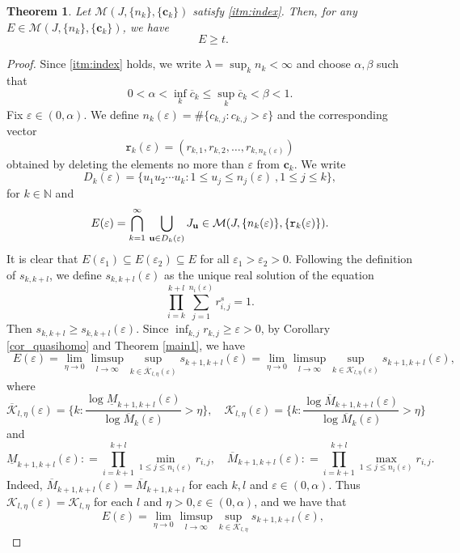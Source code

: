 \documentclass[12pt]{amsart}
\numberwithin{equation}{section}
\theoremstyle{plain}
\newtheorem{theorem}{Theorem}[section]
\theoremstyle{remark}
\theoremstyle{definition}
\newcommand{\ok}{\overline{\mathcal{K}}}
\newcommand{\kk}{\mathcal{K}}
\newcommand{\om}{\overline{M}}
\newcommand{\um}{\underline{M}}
\newcommand{\N}{\mathbb{N}}
\newcommand{\bu}{\mathbf{u}}
\newcommand{\ccc}{\mathbf{c}}
\newcommand{\rrr}{\mathtt{r}}
\newcommand{\eps}{\varepsilon}
\newcommand{\oc}{\overline{c}}
\newcommand{\lam}{\lambda}
\renewcommand{\ge}{\geqslant}
\renewcommand{\le}{\leqslant}
\renewcommand{\leq}{\leqslant}
\DeclareMathOperator{\dimqa}{dim_{qA}}
\begin{document}
	\iffalse
	\begin{theorem}\label{dayu2}
		Let $\mathcal{M}(J,\{n_k\},\{\ccc_k\})$ satisfy \ref{itm:index}. Then, for any $E\in\mathcal{M}(J,\{n_k\},\{\ccc_k\})$, we have
		\[
		\dimqa E\ge t.
		\]
	\end{theorem}
	\begin{proof}%
		Since \ref{itm:index} holds,  we write  $\lam=\sup_k n_k<\infty$ and choose  $\alpha,\beta$ such that
		\[
		0<\alpha<\inf_k \oc_k\le \sup_k \oc_k <\beta<1.
		\]
		Fix $\eps\in (0,\alpha)$. We define $n_k(\eps)=\#\{c_{k,j}:c_{k,j}>\eps\}$ and the corresponding vector
		\[
		\rrr_k(\eps)=(r_{k,1},r_{k,2},\ldots,r_{k,n_k(\eps)})
		\]
		obtained by deleting the elements no more
		than $\eps$ from $\ccc_k$. We write
		\[
		D_{k}(\eps)=\{u_{1}u_{2}\cdots u_{k}:1\leq u_{j}\leq
		n_{j}(\eps)\ , 1\le j\leq k\},
		\]
		for $k\in\N$ and
		\[
		E(\eps)=\bigcap_{k=1}^{\infty }\,\bigcup_{%
			\bu\in D_{k}(\eps)}J_{\bu}\in \mathcal{M}(J,\{n_k(\eps)\},\{\rrr_k(\eps)\}).
		\]
		It is clear that $E(\eps_1)\subseteq E(\eps_2)\subseteq E$ for all $\eps_1>\eps_2>0$. Following the definition of $s_{k,k+l}$, we define $s_{k,k+l}(\eps)$ as the unique real solution of
		the equation
		\[
		\prod_{i=k}^{k+l} \sum_{j=1}^{n_i(\eps)}r_{i,j}^s  =1.
		\]
		Then $s_{k,k+l}\ge s_{k,k+l}(\eps)$. Since $\inf_{k,j} r_{k,j}\ge \eps >0$, by Corollary \ref{cor_quasihomo} and Theorem \ref{main1}, we have
		\[
		\dimqa E(\eps)=\lim_{\eta\to 0}\limsup_{l\to\infty}\sup_{k\in \ok_{l,\eta}(\eps)} s_{k+1,k+l}(\eps)=\lim_{\eta\to 0}\limsup_{l\to\infty}\sup_{k\in \kk_{l,\eta}(\eps)} s_{k+1,k+l}(\eps),
		\]
		where
		\[
		\ok_{l,\eta}(\eps)=\Big\{k:\frac{\log \um_{k+1,k+l}(\eps)}{\log \om_{k}(\eps)}>\eta \Big\},\quad \kk_{l,\eta}(\eps)=\Big\{k:\frac{\log \om_{k+1,k+l}(\eps)}{\log \om_{k}(\eps)}>\eta \Big\}
		\]
		and
		\[
		\um_{k+1,k+l}(\eps)\colon=\prod_{i=k+1}^{k+l}\min_{1\le j\le n_i(\eps)} r_{i,j},\quad \om_{k+1,k+l}(\eps)\colon=\prod_{i=k+1}^{k+l}\max_{1\le j\le n_i(\eps)} r_{i,j}.
		\]
		Indeed, $\om_{k+1,k+l}(\eps)=\om_{k+1,k+l}$ for each $k,l$ and $\eps\in (0,\alpha)$. Thus $\kk_{l,\eta}(\eps)=\kk_{l,\eta}$ for each $l$ and $\eta>0, \eps\in (0,\alpha)$, and we have that
		\begin{equation} \label{dimeqEe}
			\dimqa E(\eps) =\lim_{\eta\to 0}\limsup_{l\to\infty}\sup_{k\in \kk_{l,\eta} } s_{k+1,k+l}(\eps),
		\end{equation}
		

\end{proof}
\end{document}

